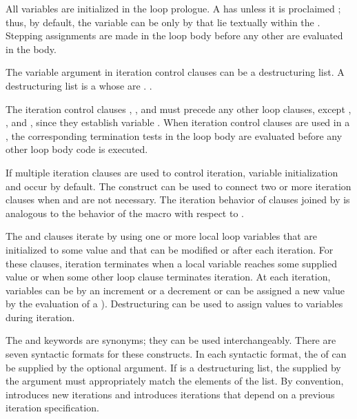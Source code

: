 All variables are initialized in the loop prologue.  
A   has 
unless it is proclaimed ;
thus, by default, the variable can be  only by  
that lie textually within the .
Stepping assignments are made in the loop body before any other 
are evaluated in the body.  
 
The variable argument in iteration control clauses can be a 
destructuring list.  A destructuring list
is a  whose   are  .
\Seesection\DestructuringLOOPVars.
 
The iteration control clauses , ,  and  
must precede any other loop clauses, except
  , , and ,
since they establish variable .  
When iteration control clauses are
used in a ,
the corresponding
termination tests in the loop body are evaluated
before any other loop body code is executed.
 
 
If multiple iteration clauses are used to control iteration, variable
initialization and  occur  by default.  
The  construct can be used to connect two or more
iteration clauses when   and 
 are not necessary.
The iteration behavior of clauses joined by 
is analogous to the behavior of the macro  with
respect to .

The  and  clauses iterate by using one or more local 
loop  variables that are initialized to some value and that 
can be modified or  after each iteration.  
For these clauses, iteration terminates when a local
variable reaches some supplied value or when some other loop clause
terminates iteration.
At each iteration, variables can be 
    by an increment or a decrement
or can be assigned a new value by the evaluation of a ).
Destructuring can be used to assign 
values to variables during iteration. 

The  and  keywords are synonyms; they can be used
interchangeably.  There are seven syntactic formats for these constructs.
In each syntactic format, the  of
 can be supplied by the optional 
argument.  If  is a destructuring list, the 
supplied by the  argument must appropriately match
the elements of the list.  
By convention,  introduces new iterations and 
introduces iterations that depend on a previous iteration specification.

